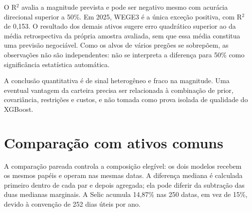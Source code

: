 O R$^{2}$ avalia a magnitude prevista e pode ser negativo mesmo com acurácia direcional superior a 50\%. Em 2025, WEGE3 é a única exceção positiva, com R$^{2}$ de 0,153. O resultado dos demais ativos sugere erro quadrático superior ao da média retrospectiva da própria amostra avaliada, sem que essa média constitua uma previsão negociável. Como os alvos de vários pregões se sobrepõem, as observações não são independentes: não se interpreta a diferença para 50\% como significância estatística automática.

A conclusão quantitativa é de sinal heterogêneo e fraco na magnitude. Uma eventual vantagem da carteira precisa ser relacionada à combinação de prior, covariância, restrições e custos, e não tomada como prova isolada de qualidade do XGBoost.



\section{Comparação com ativos comuns}
A comparação pareada controla a composição elegível: os dois modelos recebem os mesmos papéis e operam nas mesmas datas. A diferença mediana é calculada primeiro dentro de cada par e depois agregada; ela pode diferir da subtração das duas medianas marginais. A Selic acumula 14,87\% nas 250 datas, em vez de 15\%, devido à convenção de 252 dias úteis por ano.

